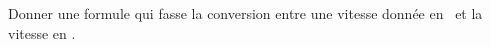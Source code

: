 
\begin{exercice}\label{exosmath-0497}

    Donner une formule qui fasse la conversion entre une vitesse donnée en \kilo\meter\per\hour\ et la vitesse en \meter\per\second.

\end{exercice}
